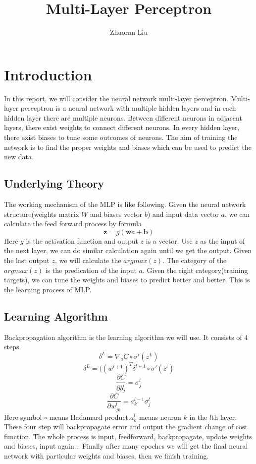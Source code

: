 \documentclass[12pt,a4paper]{article}
\author{Zhuoran Liu}
\title{Multi-Layer Perceptron}
\begin{document}
\maketitle

\color{black}
\newpage
\section{Introduction}
In this report, we will consider the neural network multi-layer perceptron. Multi-layer perceptron is a neural network with multiple hidden layers and in each hidden layer there are multiple neurons. Between different neurons in adjacent layers, there exist weights to connect different neurons. In every hidden layer, there exist biases to tune some outcomes of neurons. The aim of training the network is to find the proper weights and biases which can be used to predict the new data.
\subsection{Underlying Theory}
The working mechanism of the MLP is like following. Given the neural network structure(weights matrix $W$ and biases vector $b$) and input data vector $a$, we can calculate the feed forward process by formula
\[\textbf{z} = g(\textbf{w}a + \textbf{b})\]
Here $g$ is the activation function and output $z$ is a vector. Use $z$ as the input of the next layer, we can do similar calculation again until we get the output. Given the last output $z$, we will calculate the $argmax(z)$. The category of the $argmax(z)$ is the predication of the input $a$. Given the right category(training targets), we can tune the weights and biases to predict better and better. This is the learning process of MLP. 
\subsection{Learning Algorithm}
Backpropagation algorithm is the learning algorithm we will use. It consists of 4 steps.
\[\delta^L = \nabla_{a} C \circ \sigma'(z^{L})\]
\[\delta^L = ((w^{l+1})^{T} \delta^{l+1} \circ \sigma'(z^{l})\]
\[\frac{\partial C}{\partial b_{j}^{l}} = \sigma_{j}^{l}\]
\[\frac{\partial C}{\partial w_{jk}^{l}} = a_{k}^{l-1} \sigma_{j}^{l}\]
Here symbol $\circ$ means Hadamard product.$a_k^l$ means neuron $k$ in the $l$th layer.\\
These four step will backpropagate error and output the gradient change of cost function. The whole process is input, feedforward, backpropagate, update weights and biases, input again... Finally after many epoches we will get the final neural network with particular weights and biases, then we finish training.
\newpage
\end{document}
